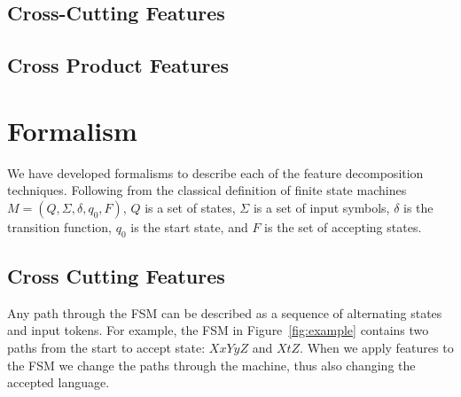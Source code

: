 \documentclass[sigplan,anonymous,review]{acmart}
\begin{document}
 
\subsection{Cross-Cutting Features}

\subsection{Cross Product Features}

\section{Formalism}\label{sec:formal}
We have developed formalisms to describe each of the feature decomposition techniques. Following from the classical definition of finite state machines $M = (Q, \Sigma, \delta, q_0, F)$, $Q$ is a set of states, $\Sigma$ is a set of input symbols, $\delta$ is the transition function, $q_0$ is the start state, and $F$ is the set of accepting states. \\

\subsection{Cross Cutting Features}
Any path through the FSM can be described as a sequence of alternating states and input tokens. For example, the FSM in Figure~\ref{fig:example} contains two paths from the start to accept state: $XxYyZ$ and $XtZ$. When we apply features to the FSM we change the paths through the machine, thus also changing the accepted language.
\end{document}
